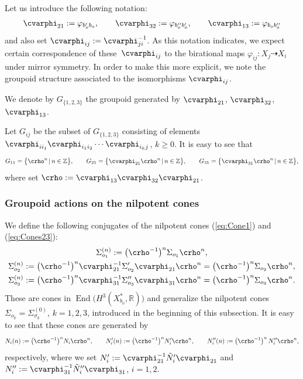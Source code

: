\documentclass[10pt,a4paper]{amsart}
\numberwithin{equation}{section}
\begin{document}
Let us introduce the following notation:
\begin{gather*}
\cvarphi_{21}:=\varphi_{b_{o}'b_{o}},\qquad \cvarphi_{32}:=\varphi_{b_{o}''b_{o}'},\qquad \cvarphi_{13}:=\varphi_{b_{o}b_{o}''}
\end{gather*}
and also set $\cvarphi_{ij}:=\cvarphi_{ji}^{-1}$. As this notation indicates, we expect certain correspondence of these~$\cvarphi_{ij}$ to the birational maps $\varphi_{ij}\colon X_{j}\dashrightarrow X_{i}$ under mirror symmetry. In order to make this more explicit, we note the groupoid structure associated to the isomorphisms $\cvarphi_{ij}$.
\begin{Definition}\label{def:crho}We denote by $G_{\{1,2,3\}}$ the groupoid generated by $\cvarphi_{21}$, $\cvarphi_{32}$, $\cvarphi_{13}$.
\end{Definition}
Let $G_{ij}$ be the subset of $G_{\{1,2,3\}}$ consisting of elements $\cvarphi_{ii_{1}}\cvarphi_{i_{1}i_{2}}\cdots\cvarphi_{i_{k}j}$, $k\geq0$. It is easy to see that
\begin{gather*}
G_{11}=\big\{ \crho^{n}\,|\, n\in\mathbb{Z}\big\} ,\qquad G_{21}=\big\{ \cvarphi_{21}\crho^{n}\,|\, n\in\mathbb{Z}\big\} ,\qquad G_{31}=\big\{ \cvarphi_{31}\crho^{n}\,|\, n\in\mathbb{Z}\big\} ,
\end{gather*}
where set $\crho:=\cvarphi_{13}\cvarphi_{32}\cvarphi_{21}$.

\subsubsection{Groupoid actions on the nilpotent cones} \label{para:Sigma(n)-and-Ni(n)}
We define the following conjugates of the nilpotent cones (\ref{eq:Cone1}) and (\ref{eq:Cones23}):
\begin{gather*}
\Sigma_{o_{1}}^{(n)}:=\big(\crho^{-1}\big)^{n}\Sigma_{o_{1}}\crho^{n},\\
\Sigma_{o_{2}}^{(n)}:=\big(\crho^{-1}\big)^{n}\cvarphi_{21}^{-1}\Sigma_{o_{2}}'\cvarphi_{21}\crho^{n} =\big(\crho^{-1}\big)^{n}\Sigma_{o_{2}}\crho^{n},\\
\Sigma_{o_{3}}^{(n)}:=\big(\crho^{-1}\big)^{n}\cvarphi_{31}^{-1}\Sigma_{o_{3}}''\cvarphi_{31}\crho^{n} =\big(\crho^{-1}\big)^{n}\Sigma_{o_{3}}\crho^{n}.
\end{gather*}
These are cones in $\operatorname{End}\big(H^{3}(X_{b_{o}}^{*},\mathbb{R})\big)$ and generalize the nilpotent cones $\Sigma_{o_{k}}=\Sigma_{\sigma_{k}}^{(0)}$, $k=1,2,3$, introduced in the beginning of this subsection. It is easy to see that these cones are generated by
\begin{gather*}
N_{i}(n):=\big(\crho^{-1}\big)^{n} N_{i} \crho^{n},\qquad N_{i}'(n):=\big(\crho^{-1}\big)^{n} N_{i}' \crho^{n},\qquad N_{i}''(n):=\big(\crho^{-1}\big)^{n}\,N_{i}'' \crho^{n},
\end{gather*}
respectively, where we set $N_{i}':=\cvarphi_{21}^{-1}\tilde{N}_{i}'\cvarphi_{21}$ and $N_{i}'':=\cvarphi_{31}^{-1}\tilde{N}_{i}''\cvarphi_{31}$, $i=1,2$.
\end{document}
